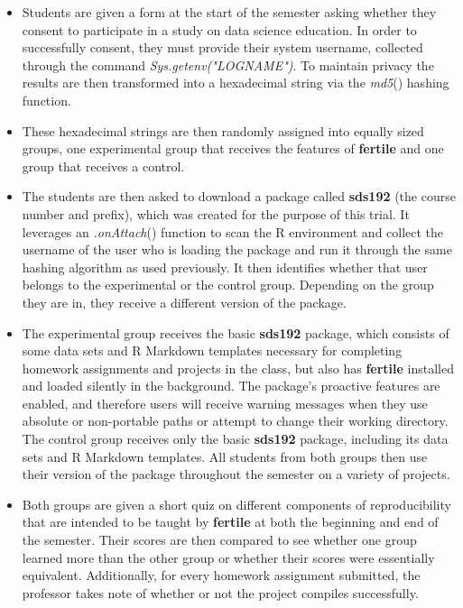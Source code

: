 \documentclass[APA,LATO1COL]{WileyNJD-v2}\usepackage[]{graphicx}\usepackage[]{color}
\newcommand{\R}{\textsf{R}\xspace}
\newcommand{\cmd}[1]{\textit{#1}}
\newcommand{\pkg}[1]{\textbf{#1}}
\newcommand{\func}[1]{\textit{#1}()}
\begin{document}
\begin{itemize}[noitemsep]

\item Students are given a form at the start of the semester asking whether they consent to participate in a study on data science education. In order to successfully consent, they must provide their system username, collected through the command \cmd{Sys.getenv("LOGNAME")}. To maintain privacy the results are then transformed into a hexadecimal string via the \func{md5} hashing function. 

\item These hexadecimal strings are then randomly assigned into equally sized groups, one experimental group that receives the features of \pkg{fertile} and one group that receives a control.

\item The students are then asked to download a package called \pkg{sds192} (the course number and prefix), which was created for the purpose of this trial. It leverages an \func{.onAttach} function to scan the \R environment and collect the username of the user who is loading the package and run it through the same hashing algorithm as used previously. It then identifies whether that user belongs to the experimental or the control group. Depending on the group they are in, they receive a different version of the package.

\item The experimental group receives the basic \pkg{sds192} package, which consists of some data sets and \R Markdown templates necessary for completing homework assignments and projects in the class, but also has \pkg{fertile} installed and loaded silently in the background. The package's proactive features are enabled, and therefore users will receive warning messages when they use absolute or non-portable paths or attempt to change their working directory. The control group receives only the basic \pkg{sds192} package, including its data sets and \R Markdown templates. All students from both groups then use their version of the package throughout the semester on a variety of projects.

\item Both groups are given a short quiz on different components of reproducibility that are intended to be taught by \pkg{fertile} at both the beginning and end of the semester. Their scores are then compared to see whether one group learned more than the other group or whether their scores were essentially equivalent. Additionally, for every homework assignment submitted, the professor takes note of whether or not the project compiles successfully.

\end{itemize}
\end{document}
